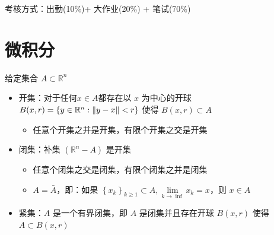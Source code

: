 


\newcommand\Title{智能计算数学基础笔记}
\renewcommand\due{due: November 6, 2022}
\newcommand\dom{\operatorname{dom}} %
\newcommand\diag{\operatorname{diag}} %
\newcommand\epi{\operatorname{epi}} %
\newcommand\minimize{\operatorname{minimize}} %
\newcommand\maximize{\operatorname{maximize}} %
\newcommand\subject{\operatorname{subject\ to}}
\newcommand\vc{\overrightarrow} %




考核方式：出勤(10\%)+ 大作业(20\%) + 笔试(70\%)

\section{微积分}
\begin{remark}
    给定集合 $A \subset \mathbb{R}^n$\begin{itemize}
        \item 开集：对于任何$x \in A$都存在以 $x$ 为中心的开球 $B(x, r) = \left\{y \in \mathbb{R}^n: \norm{y - x} < r\right\}$ 使得 $B(x, r) \subset A$\begin{itemize}
            \item 任意个开集之并是开集，有限个开集之交是开集
        \end{itemize}
        \item 闭集：补集 $(\mathbb{R}^n - A)$ 是开集\begin{itemize}
            \item 任意个闭集之交是闭集，有限个闭集之并是闭集
            \item $A = \bar{A}$，即：如果 $\left\{x_k\right\}_{k \ge 1} \subset A,\underset{k \to \inf}{\lim}x_k = x$，则 $x \in A$
        \end{itemize}
        \item  紧集：$A$ 是一个有界闭集，即 $A$ 是闭集并且存在开球 $B(x, r)$ 使得 $A \subset B(x, r)$
    \end{itemize}
\end{remark}


